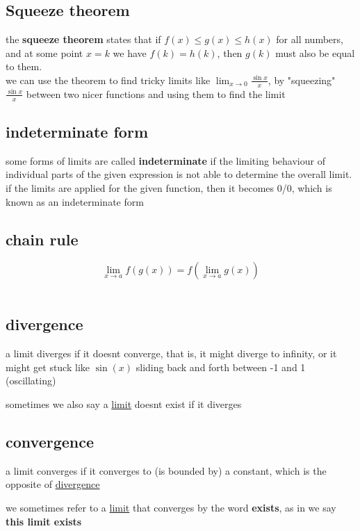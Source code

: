 \documentclass[a4paper,12pt]{article}
\newcommand{\?}{\stackrel{?}{=}}
\begin{document}
\subsection{Squeeze theorem}
\label{sec:org6d719ce}
the \textbf{squeeze theorem} states that if \(f(x) \le g(x) \le h(x)\) for all numbers, and at some point \(x=k\) we have \(f(k)=h(k)\), then \(g(k)\) must also be equal to them.\\[0pt]
we can use the theorem to find tricky limits like \(\lim_{x \to 0} \frac{\sin x}{x}\), by "squeezing" \(\frac{\sin x}{x}\) between two nicer functions and using them to find the limit\\[0pt]
\subsection{indeterminate form}
\label{sec:orgd592a44}
some forms of limits are called \textbf{indeterminate} if the limiting behaviour of individual parts of the given expression is not able to determine the overall limit. if the limits are applied for the given function, then it becomes 0/0, which is known as an indeterminate form\\[0pt]
\subsection{chain rule}
\label{sec:org7e51f11}
\[
  \lim_{x\to a} f(g(x)) = f\left(\lim_{x\to a}g(x)\right)
\]\\[0pt]
\subsection{divergence}
\label{sec:orga069cab}
\begin{definition}
a limit diverges if it doesnt converge, that is, it might diverge to infinity, or it might get stuck like \(\sin(x)\) sliding back and forth between -1 and 1 (oscillating)\\[0pt]
\begin{note}
sometimes we also say a \hyperref[sec:org8cc3125]{limit} doesnt exist if it diverges\\[0pt]
\end{note}
\end{definition}
\subsection{convergence}
\label{sec:org0440354}
\begin{definition}
a limit converges if it converges to (is bounded by) a constant, which is the opposite of \hyperref[sec:orga069cab]{divergence}\\[0pt]
\begin{note}
we sometimes refer to a \hyperref[sec:org8cc3125]{limit} that converges by the word \textbf{exists}, as in we say \textbf{this limit exists}\\[0pt]
\end{note}
\end{definition}
\end{document}
